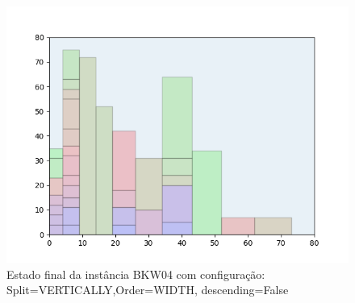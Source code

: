 \begin{figure}[H]
    \centering
    \caption[]{Estado final da instância BKW04 com configuração: Split=VERTICALLY,Order=WIDTH, descending=False}
    \label{fig:bkw04-vertically-width-false}
    \includegraphics[scale=0.5]{output/figures/bkw/bkw04/vertically/width/false/00}
\end{figure}